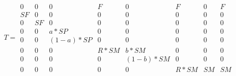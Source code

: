 \documentclass{report}
\begin{document}
\[
 T = 
  \begin{matrix}
                  0&0&0&F&0&F&0&F\\
                  SF&0&0&0&0&0&0&0\\
                  0&SF&0&0&0&0&0&0\\
                  0&0&a*SP&0&0&0&0&0\\
                  0&0&(1-a)*SP&0&0&0&0&0\\
                  0&0&0&R*SM& b*SM&0&0&0\\
                  0&0&0&0& (1-b)*SM&0&0&0\\
                  0&0&0&0&0&R*SM&SM&SM

  \end{matrix}
\]
\end{document}
